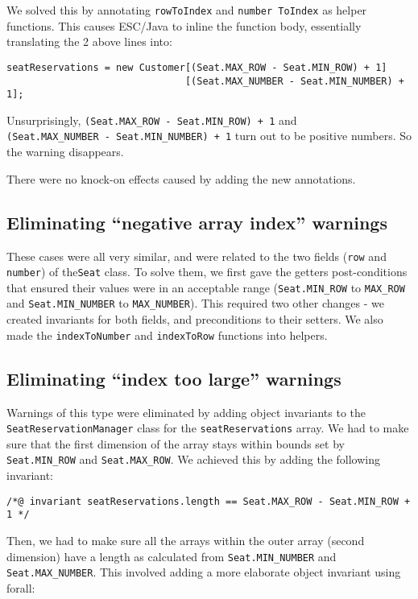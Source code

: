 \documentclass[11pt]{article}
\begin{document}
We solved this by annotating \verb|rowToIndex| and \verb|number ToIndex| as helper functions. This causes ESC/Java to inline the function body, essentially translating the 2 above lines into:

\noindent
\begin{verbatim}
seatReservations = new Customer[(Seat.MAX_ROW - Seat.MIN_ROW) + 1]
                               [(Seat.MAX_NUMBER - Seat.MIN_NUMBER) + 1];
\end{verbatim}

Unsurprisingly, \verb|(Seat.MAX_ROW - Seat.MIN_ROW) + 1| and \\
\verb|(Seat.MAX_NUMBER - Seat.MIN_NUMBER) + 1| turn out to be positive numbers. So the warning disappears.

There were no knock-on effects caused by adding the new annotations.

\subsection{Eliminating ``negative array index'' warnings}

These cases were all very similar, and were related to the two fields (\verb|row| and \verb|number|) of the\verb|Seat| class. To solve them, we first gave the getters post-conditions that ensured their values were in an acceptable range (\verb|Seat.MIN_ROW| to \verb|MAX_ROW| and \verb|Seat.MIN_NUMBER| to \verb|MAX_NUMBER|). This required two other changes - we created invariants for both fields, and preconditions to their setters. We also made the \verb|indexToNumber| and \verb|indexToRow| functions into helpers.

\subsection{Eliminating ``index too large'' warnings}

Warnings of this type were eliminated by adding object invariants to the \verb|SeatReservationManager| class for the \verb|seatReservations| array. We had to make sure that the first dimension of the array stays within bounds set by \verb|Seat.MIN_ROW| and \verb|Seat.MAX_ROW|. We achieved this by adding the following invariant:

\noindent
\begin{verbatim}
/*@ invariant seatReservations.length == Seat.MAX_ROW - Seat.MIN_ROW + 1 */
\end{verbatim}

Then, we had to make sure all the arrays within the outer array (second dimension) have a length as calculated from \verb|Seat.MIN_NUMBER| and \verb|Seat.MAX_NUMBER|. This involved adding a more elaborate object invariant using forall:
\end{document}

